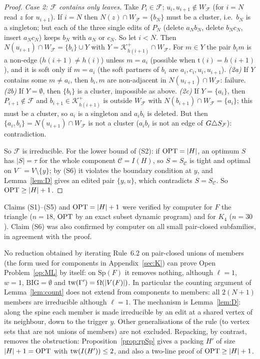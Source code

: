 \begin{proof}
\emph{Case 2: $\mathcal F$ contains only leaves.} Take $P_i\in\mathcal F$; $u_i,u_{i+1}\notin W_{\mathcal F}$ (for $i=N$ read $z$ for $u_{i+1}$). If $i=N$ then $N(z)\cap W_{\mathcal F}=\{b_N\}$ must be a cluster, i.e.\ $b_N$ is a singleton; but each of the three single edits of $P_N$ (delete $a_Nb_N$, delete $b_Nc_N$, insert $a_Nc_N$) keeps $b_N$ with $a_N$ or $c_N$. So let $i<N$. Then $N(u_{i+1})\cap W_{\mathcal F}=\{b_i\}\cup Y$ with $Y=\mathcal K^+_{h(i+1)}\cap W_{\mathcal F}$. For $m\in Y$ the pair $b_im$ is a non-edge ($h(i+1)\ne h(i)$) unless $m=a_i$ (possible when $\mathrm t(i)=h(i+1)$), and it is soft only if $m=a_i$ (the soft partners of $b_i$ are $a_i,c_i,u_i,u_{i+1}$). \emph{(2a)} If $Y$ contains some $m\ne a_i$, then $b_i,m$ are non-adjacent in $N(u_{i+1})\cap W_{\mathcal F}$: failure. \emph{(2b)} If $Y=\emptyset$, then $\{b_i\}$ is a cluster, impossible as above. \emph{(2c)} If $Y=\{a_i\}$, then $P_{i+1}\notin\mathcal F$ and $b_{i+1}\in \mathcal K^+_{h(i+1)}$ is outside $W_{\mathcal F}$ with $N(b_{i+1})\cap W_{\mathcal F}=\{a_i\}$; this must be a cluster, so $a_i$ is a singleton and $a_ib_i$ is deleted. But then $\{a_i,b_i\}=N(u_{i+1})\cap W_{\mathcal F}$ is not a cluster ($a_ib_i$ is not an edge of $G\triangle S_{\mathcal F}$): contradiction.

So $\mathcal F$ is irreducible. For the lower bound of (S2): if $\mathrm{OPT}=|H|$, an optimum $S$ has $|S|=\tau$ for the whole component $\mathcal C=I(H)$, so $S=S_{\mathcal C}$ is tight and optimal on $V^-=V\setminus\{y\}$; by (S6) it violates the boundary condition at $y$, and Lemma~\ref{lem:D} gives an edited pair $\{y,u\}$, which contradicts $S=S_{\mathcal C}$. So $\mathrm{OPT}\ge|H|+1$.
\end{proof}
\begin{remark}\label{rem:fivecov}
Claims (S1)--(S5) and $\mathrm{OPT}=|H|+1$ were verified by computer for $F$ the triangle ($n=18$, $\mathrm{OPT}$ by an exact subset dynamic program) and for $K_4$ ($n=30$). Claim (S6) was also confirmed by computer on all small pair-closed subfamilies, in agreement with the proof.
\end{remark}

No reduction obtained by iterating Rule~6.2 on pair-closed unions of members (the form used for components in Appendix~\ref{sec:K}) can prove Open Problem~\ref{op:ML} by itself: on $\mathrm{Sp}(F)$ it removes nothing, although $\ell=1$, $w=1$, $\mathrm{BIG}=\emptyset$ and $\mathrm{tw}(\Gamma')=\Omega(|V(F)|)$. In particular the counting argument of Lemma~\ref{lem:count} does not extend from components to members: all $2(N+1)$ members are irreducible although $\ell=1$. The mechanism is Lemma~\ref{lem:D}: along the spine each member is made irreducible by an edit at a shared vertex of its neighbour, down to the trigger $y$. Other generalisations of the rule (to vertex sets that are not unions of members) are not excluded. Repacking, by contrast, removes the obstruction: Proposition~\ref{prop:rpSp} gives a packing $H'$ of size $|H|+1=\mathrm{OPT}$ with $\mathrm{tw}(I(H'))\le2$, and also a two-line proof of $\mathrm{OPT}\ge|H|+1$.

